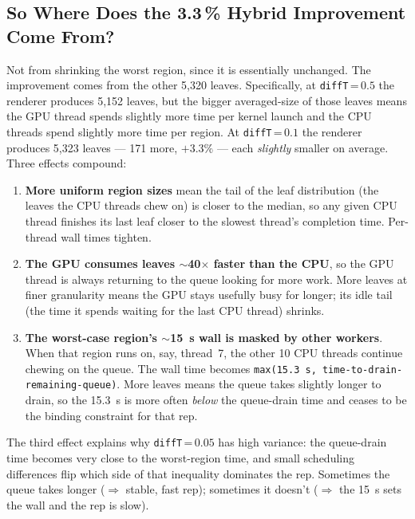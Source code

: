 \documentclass[
	english,
	letterpaper, oneside
]{article}
\begin{document}
\subsection{So Where Does the 3.3\,\% Hybrid Improvement Come From?}

Not from shrinking the worst region, since it is essentially
unchanged. The improvement comes from the other 5{,}320 leaves.
Specifically, at \texttt{diffT}\,=\,$0.5$ the renderer produces 5{,}152
leaves, but the bigger averaged-size of those leaves means the GPU
thread spends slightly more time per kernel launch and the CPU threads
spend slightly more time per region. At \texttt{diffT}\,=\,$0.1$ the
renderer produces 5{,}323 leaves --- 171 more, $+3.3\%$ --- each
\emph{slightly} smaller on average. Three effects compound:

\begin{enumerate}
    \item \textbf{More uniform region sizes} mean the tail of the leaf
    distribution (the leaves the CPU threads chew on) is closer to
    the median, so any given CPU thread finishes its last leaf closer
    to the slowest thread's completion time. Per-thread wall times
    tighten.
    \item \textbf{The GPU consumes leaves $\sim$40$\times$ faster than
    the CPU}, so the GPU thread is always returning to the queue
    looking for more work. More leaves at finer granularity means the
    GPU stays usefully busy for longer; its idle tail (the time it
    spends waiting for the last CPU thread) shrinks.
    \item \textbf{The worst-case region's $\sim$15~s wall is masked by
    other workers}. When that region runs on, say, thread~7, the
    other 10 CPU threads continue chewing on the queue. The wall time
    becomes \texttt{max(15.3~s,~time-to-drain-remaining-queue)}. More
    leaves means the queue takes slightly longer to drain, so the
    15.3~s is more often \emph{below} the queue-drain time and ceases
    to be the binding constraint for that rep.
\end{enumerate}

\noindent
The third effect explains why \texttt{diffT}\,=\,$0.05$ has high
variance: the queue-drain time becomes very close to the worst-region
time, and small scheduling differences flip which side of that
inequality dominates the rep. Sometimes the queue takes longer
($\Rightarrow$ stable, fast rep); sometimes it doesn't
($\Rightarrow$ the 15~s sets the wall and the rep is slow).
\end{document}
